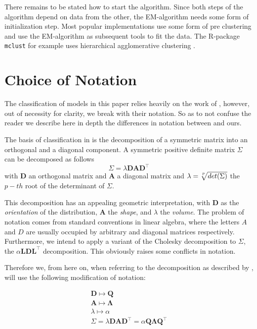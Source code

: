There remains to be stated how to start the algorithm. Since both steps of the
algorithm depend on data from the other, the EM-algorithm needs some form of 
initialization step.
Most popular implementations use some form of pre clustering and use the 
EM-algorithm as subsequent tools to fit the data. The R-package {\tt mclust} 
for example uses hierarchical agglomerative clustering \cite{Scr16}.



\section{Choice of Notation}
\label{sec:notation}

The classification of models in this paper relies heavily on the work of 
\cite{Cel95}, however, out of necessity for clarity, we break with their 
notation. 
So as to not confuse the reader we describe here in depth the differences in 
notation between \cite{Cel95} and ours.

The basis of classification in \cite{Cel95} is the decomposition of a
symmetric matrix into an orthogonal and a diagonal component.
A symmetric positive definite matrix $ \Sigma $ can be decomposed as follows
\begin{equation} 
    \Sigma = \lambda \pmb{D} \pmb{A} \pmb{D}^{\top}
\end{equation}
with $ \pmb{D} $ an orthogonal matrix and $ \pmb{A} $ a diagonal matrix and
$ \lambda = \sqrt[\uproot{3}p]{det(\Sigma)} $ the $ p-th $ root of the 
determinant of $ \Sigma $.

This decomposition has an appealing geometric interpretation, with $ \pmb{D} $ 
as the \textit{orientation} of the distribution, $ \pmb{A} $ the \textit{shape},
and $ \lambda $ the \textit{volume}. The problem of notation comes from standard 
conventions in linear algebra, where the letters $A$ and $D$ are usually 
occupied by arbitrary and diagonal matrices respectively. Furthermore, we intend
to apply a variant of the Cholesky decomposition to $ \Sigma $, the 
$ \alpha\pmb{L}\pmb{D}\pmb{L}^{\top} $ decomposition. This obviously raises some
conflicts in notation.

Therefore we, from here on, when referring to the decomposition as described by 
\cite{Cel95}, will use the following modification of notation:

\begin{gather} 
    \pmb{D} \longmapsto \pmb{Q} \\
    \pmb{A} \longmapsto \pmb{\Lambda} \\
    \lambda \longmapsto \alpha  \\
    \Sigma = \lambda \pmb{D} \pmb{A} \pmb{D}^\top =
        \alpha \pmb{Q} \pmb{\Lambda} \pmb{Q}^\top
\end{gather}

